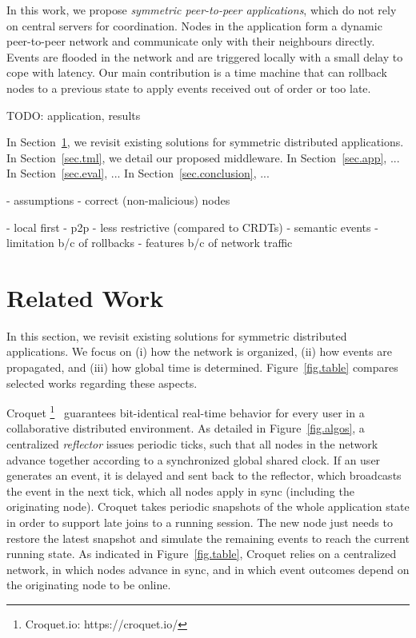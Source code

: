 \documentclass[10pt,journal,compsoc]{IEEEtran}
\begin{document}
In this work, we propose \emph{symmetric peer-to-peer applications}, which
do not rely on central servers for coordination.
Nodes in the application form a dynamic peer-to-peer network and communicate
only with their neighbours directly.
Events are flooded in the network and are triggered locally with a small
delay to cope with latency.
Our main contribution is a time machine that can rollback nodes to a previous
state to apply events received out of order or too late.

TODO: application, results

In Section~\ref{sec.related}, we revisit existing solutions for symmetric
distributed applications.
In Section~\ref{sec.tml}, we detail our proposed middleware.
In Section~\ref{sec.app}, ...
In Section~\ref{sec.eval}, ...
In Section~\ref{sec.conclusion}, ...

- assumptions
    - correct (non-malicious) nodes

- local first
- p2p
- less restrictive (compared to CRDTs)
- semantic events
    - limitation b/c of rollbacks
    - features b/c of network traffic

\section{Related Work}
\label{sec.related}

In this section, we revisit existing solutions for symmetric distributed
applications.
We focus on (i) how the network is organized, (ii) how events are propagated,
and (iii) how global time is determined.
Figure~\ref{fig.table} compares selected works regarding these aspects.

Croquet%
\footnote{Croquet.io: https://croquet.io/}~\cite{TODO} guarantees
bit-identical real-time behavior for every user in a collaborative
distributed environment.
%
As detailed in Figure~\ref{fig.algos}, a centralized \emph{reflector} issues
periodic ticks, such that all nodes in the network advance together according
to a synchronized global shared clock.
If an user generates an event, it is delayed and sent back to the reflector,
which broadcasts the event in the next tick, which all nodes apply in sync
(including the originating node).
%
Croquet takes periodic snapshots of the whole application state in order to
support late joins to a running session.
The new node just needs to restore the latest snapshot and simulate the
remaining events to reach the current running state.
%
As indicated in Figure~\ref{fig.table}, Croquet relies on a centralized
network, in which nodes advance in sync, and in which event outcomes depend
on the originating node to be online.
\end{document}
